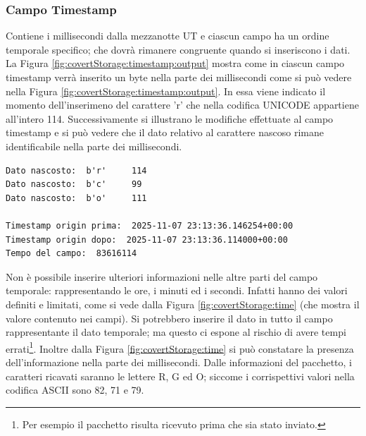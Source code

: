 \subsubsection{Campo \textbf{Timestamp}}
Contiene i millisecondi dalla mezzanotte UT e ciascun campo ha un ordine temporale 
specifico; che dovrà rimanere congruente quando si inseriscono i dati. 
La Figura \ref{fig:covertStorage:timestamp:output} mostra come in ciascun 
campo timestamp verrà inserito un byte nella parte 
dei millisecondi come si può vedere nella 
Figura \ref{fig:covertStorage:timestamp:output}. 
In essa viene indicato il momento dell'inserimeno del carattere 
'r' che nella codifica UNICODE appartiene all'intero 114. 
Successivamente si illustrano le modifiche effettuate al campo 
timestamp e si può vedere che il dato relativo al carattere 
nascoso rimane identificabile nella parte dei millisecondi. 
\newline
\begin{lstlisting}
Dato nascosto:  b'r'     114
Dato nascosto:  b'c'     99
Dato nascosto:  b'o'     111

Timestamp origin prima:  2025-11-07 23:13:36.146254+00:00
Timestamp origin dopo:  2025-11-07 23:13:36.114000+00:00
Tempo del campo:  83616114 
\end{lstlisting}
\label{fig:covertStorage:timestamp:output} 
\vspace{2ex} 
Non è possibile inserire ulteriori informazioni nelle altre parti  del 
campo temporale: rappresentando le ore, i minuti ed i secondi. 
Infatti hanno dei valori definiti e limitati, come si vede dalla Figura \ref{fig:covertStorage:time} (che mostra il valore contenuto nei campi). 
\vspace{1ex} \newline
Si potrebbero inserire il dato in tutto il campo rappresentante il dato temporale; 
ma questo ci espone al rischio di avere tempi errati\footnote{
    Per esempio il pacchetto risulta ricevuto prima che sia stato inviato. 
}. 
\vspace{2ex} \newline 
Inoltre dalla Figura \ref{fig:covertStorage:time} si può constatare la presenza 
dell'informazione nella parte dei millisecondi. Dalle informazioni del pacchetto, 
i caratteri ricavati saranno le lettere R, G ed O; siccome i corrispettivi 
valori nella codifica ASCII \cite{ascii-table} sono 82, 71 e 79. 
\vspace{3ex}\newline 
